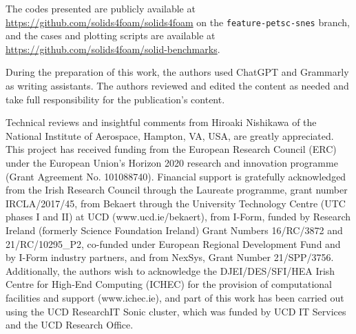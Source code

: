\documentclass[sn-mathphys,Numbered]{sn-jnl}%
\begin{document}
\backmatter

The codes presented are publicly available at \url{https://github.com/solids4foam/solids4foam} on the \texttt{feature-petsc-snes} branch, and the cases and plotting scripts are available at \url{https://github.com/solids4foam/solid-benchmarks}.

During the preparation of this work, the authors used ChatGPT and Grammarly as writing assistants.
The authors reviewed and edited the content as needed and take full responsibility for the publication's content.

Technical reviews and insightful comments from Hiroaki Nishikawa of the National Institute of Aerospace, Hampton, VA, USA, are greatly appreciated.
This project has received funding from the European Research Council (ERC) under the European Union’s Horizon 2020 research and innovation programme (Grant Agreement No. 101088740).
Financial support is gratefully acknowledged from the Irish Research Council
through the Laureate programme, grant number IRCLA/2017/45, from Bekaert through the University Technology Centre (UTC phases I and II) at UCD
(www.ucd.ie/bekaert), from I-Form, funded by Research Ireland (formerly Science Foundation Ireland)
Grant Numbers {16/RC/3872} and {21/RC/10295\_P2}, co-funded under European Regional Development Fund and by I-Form industry partners, and from NexSys, Grant Number 21/SPP/3756.
Additionally, the authors wish to acknowledge the DJEI/DES/SFI/HEA Irish Centre for High-End Computing (ICHEC) for the provision of computational facilities and support (www.ichec.ie), and part of this work has been carried out using the UCD ResearchIT Sonic cluster, which was funded by UCD IT Services and the UCD Research Office.



\newpage
\end{document}
